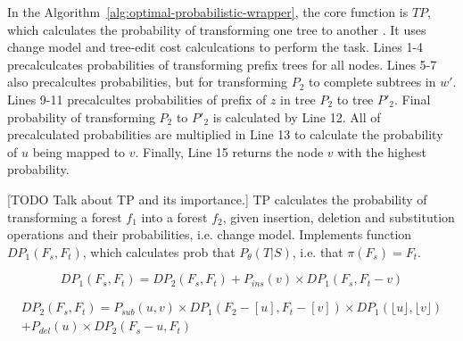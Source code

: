 In the Algorithm~\ref{alg:optimal-probabilistic-wrapper}, the core function is $TP$, which calculates the probability of transforming one tree to another \cite{dalvi2009a}. It uses change model and tree-edit cost calculcations to perform the task. Lines 1-4 precalculcates probabilities of transforming prefix trees for all nodes. Lines 5-7 also precalcultes probabilities, but for transforming $P_2$ to complete subtrees in $w'$. Lines 9-11 precalcultes probabilities of prefix of $z$ in tree $P_2$ to tree $P'_2$. Final probability of transforming $P_2$ to $P'_2$ is calculated by Line 12. All of precalculated probabilities are multiplied in Line 13 to calculate the probability of $u$ being mapped to $v$. Finally, Line 15 returns the node $v$ with the highest probability.

[TODO Talk about TP and its importance.]
TP calculates the probability of transforming a forest $f_1$ into a forest $f_2$, given insertion, deletion and substitution operations and their probabilities, i.e. change model. Implements function $DP_1(F_s, F_t)$, which calculates prob that $P_{\theta}(T|S)$, i.e. that $\pi(F_s) = F_t$.

\begin{equation}
	DP_1(F_s, F_t) = DP_2(F_s, F_t) + P_{ins}(v) \times DP_1(F_s, F_t - v)
\end{equation}

\begin{equation}
	\begin{split}
		DP_2(F_s, F_t) = P_{sub}(u, v) \times DP_1(F_2 - [u], F_t - [v]) \times DP_1(\lfloor u \rfloor, \lfloor v \rfloor) \\
		+ P_{del}(u) \times DP_2(F_s - u, F_t)
	\end{split}
\end{equation}





